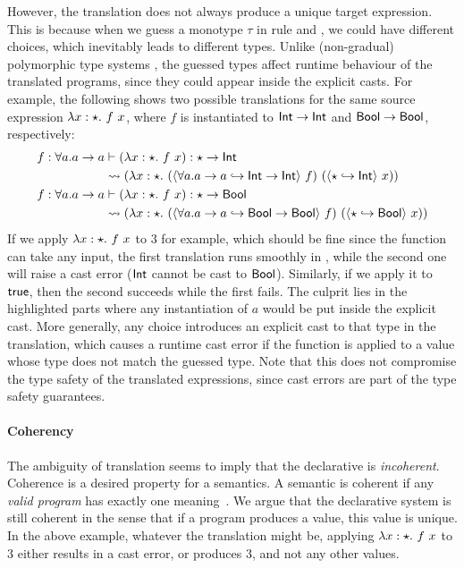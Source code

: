 However, the translation does not always produce a unique target expression.
This is because when we guess a monotype $\tau$ in rule  and
, we could have different choices, which inevitably leads to
different types. Unlike (non-gradual) polymorphic type systems
\citep{jones2007practical, dunfield2013complete}, the guessed types affect
runtime behaviour of the translated programs, since they could appear inside the
explicit casts. For example, the following shows two possible translations for
the same source expression $\lambda x:\star.~ {f ~ x}$, where $f$ is
instantiated to $\mathsf{Int} \to \mathsf{Int}$ and $\mathsf{Bool} \to \mathsf{Bool}$, respectively:
\begin{align*}
  f: \forall a. a \to a &\vdash (\lambda x:\star.~ {f ~ x})
                          : \star \to \mathsf{Int} \\
                          &\rightsquigarrow{(}\lambda x:\star.~ (\langle \forall a. a \to a \hookrightarrow \mathsf{Int} \to \mathsf{Int} \rangle ~ f) ~
                          ({\langle \star \hookrightarrow \mathsf{Int} \rangle ~} x))
  \\
  f: \forall a. a \to a &\vdash (\lambda x:\star.~ {f ~ x})
                          : \star \to \mathsf{Bool} \\
                          &\rightsquigarrow{(}\lambda x:\star.~ (\langle \forall a. a \to a \hookrightarrow \mathsf{Bool} \to \mathsf{Bool} \rangle ~ f) ~
                          ({\langle \star \hookrightarrow \mathsf{Bool} \rangle ~} x))
\end{align*}
If we apply $\lambda x:\star.~ {f ~ x}$ to $3$ for example, which should be fine
since the function can take any input, the first translation runs smoothly in
\pbc, while the second one will raise a cast error ($\mathsf{Int}$ cannot be cast to
$\mathsf{Bool}$). Similarly, if we apply it to $\mathsf{true}$, then the second succeeds while
the first fails. The culprit lies in the highlighted parts where any
instantiation of $a$ would be put inside the explicit cast. More generally, any
choice introduces an explicit cast to that type in the translation, which causes
a runtime cast error if the function is applied to a value whose type does not
match the guessed type. Note that this does not compromise the type safety of
the translated expressions, since cast errors are part of the type safety
guarantees.

\paragraph{Coherency}

The ambiguity of translation seems to imply that the
declarative is \textit{incoherent}. Coherence is a desired
property for a semantics. A semantic is coherent if any \textit{valid program}
has exactly one meaning~\cite{Reynolds_coherence}. We argue that the declarative
system is still coherent in the sense that if a program produces a value, this
value is unique. In the above example, whatever the translation might be,
applying $\lambda x:\star.~ {f ~ x}$ to $3$ either results in a cast error, or
produces $3$, and not any other values.

